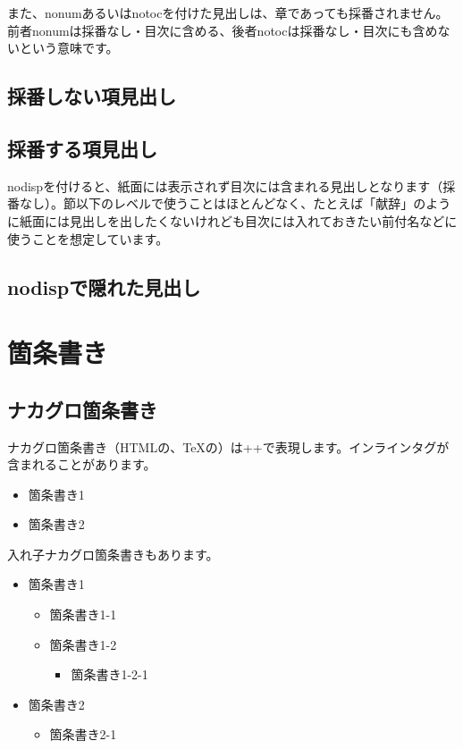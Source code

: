また、nonumあるいはnotocを付けた見出しは、章であっても採番されません。前者nonumは採番なし・目次に含める、後者notocは採番なし・目次にも含めないという意味です。

\subsection{採番しない項見出し}
\label{sec:1-2-2}

\subsection{採番する項見出し}
\label{sec:1-2-3}

nodispを付けると、紙面には表示されず目次には含まれる見出しとなります（採番なし）。節以下のレベルで使うことはほとんどなく、たとえば「献辞」のように紙面には見出しを出したくないけれども目次には入れておきたい前付名などに使うことを想定しています。

\subsection{nodispで隠れた見出し}
\label{sec:1-2-4}

\section{箇条書き}
\label{sec:1-3}

\subsection{ナカグロ箇条書き}
\label{sec:1-3-1}

ナカグロ箇条書き（HTMLの、TeXの）は+\reviewcode{*}+で表現します。インラインタグが含まれることがあります。


\begin{itemize}
\item 箇条書き1
\item 箇条書き2
\end{itemize}

入れ子ナカグロ箇条書きもあります。


\begin{itemize}
\item 箇条書き1
\begin{itemize}
\item 箇条書き1{-}1
\item 箇条書き1{-}2
\begin{itemize}
\item 箇条書き1{-}2{-}1
\end{itemize}


\end{itemize}


\item 箇条書き2
\begin{itemize}
\item 箇条書き2{-}1
\end{itemize}


\end{itemize}

